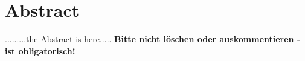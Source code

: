 \chapter*{Abstract}
.........the Abstract is here.....
\textbf{Bitte nicht löschen oder auskommentieren - ist obligatorisch!}